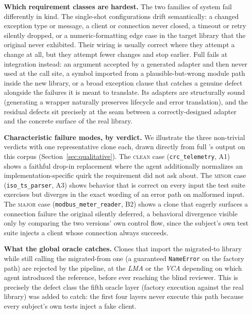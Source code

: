 \textbf{Which requirement classes are hardest.} The two families of system fail differently in kind. The single-shot configurations drift semantically: a changed exception type or message, a client or connection never closed, a timeout or retry silently dropped, or a numeric-formatting edge case in the target library that the original never exhibited. Their wiring is usually correct where they attempt a change at all, but they attempt fewer changes and stop earlier. Full \sys fails at integration instead: an argument accepted by a generated adapter and then never used at the call site, a symbol imported from a plausible-but-wrong module path inside the new library, or a broad exception clause that catches a genuine defect alongside the failures it is meant to translate. Its adapters are structurally sound (generating a wrapper naturally preserves lifecycle and error translation), and the residual defects sit precisely at the seam between a correctly-designed adapter and the concrete surface of the real library.

\textbf{Characteristic failure modes, by verdict.} We illustrate the three non-trivial verdicts with one representative clone each, drawn directly from full \sys's output on this corpus (Section~\ref{sec:qualitative}). The \textsc{clean} case (\texttt{crc\_telemetry}, A1) shows a faithful drop-in replacement where the agent additionally normalizes an implementation-specific quirk the requirement did not ask about. The \textsc{minor} case (\texttt{iso\_ts\_parser}, A3) shows behavior that is correct on every input the test suite exercises but diverges in the exact wording of an error path on malformed input. The \textsc{major} case (\texttt{modbus\_meter\_reader}, B2) shows a clone that eagerly surfaces a connection failure the original silently deferred, a behavioral divergence visible only by comparing the two versions' own control flow, since the subject's own test suite injects a client whose connection always succeeds.

\textbf{What the global oracle catches.} Clones that import the migrated-to library while still calling the migrated-from one (a guaranteed \texttt{NameError} on the factory path) are rejected by the pipeline, at the \emph{LMA} or the \emph{VCA} depending on which agent introduced the reference, before ever reaching the blind reviewer. This is precisely the defect class the fifth oracle layer (factory execution against the real library) was added to catch: the first four layers never execute this path because every subject's own tests inject a fake client.

